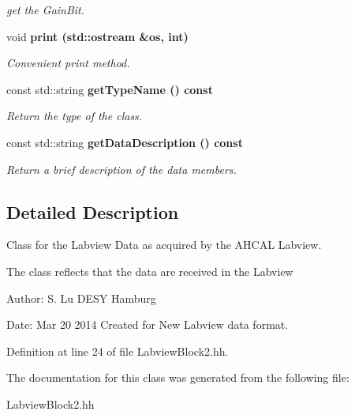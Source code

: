 \begin{CompactItemize}
\begin{CompactList}\small\item\em get the Gain\-Bit. \item\end{CompactList}\item 
void \bf{print} (std::ostream \&os, int)\label{classCALICE_1_1LabviewBlock2_6798a2e15897864857ee0af2d3028bc1}

\begin{CompactList}\small\item\em Convenient print method. \item\end{CompactList}\item 
const std::string \bf{get\-Type\-Name} () const \label{classCALICE_1_1LabviewBlock2_4d821c9d5842cbff0af2e0305be868c8}

\begin{CompactList}\small\item\em Return the type of the class. \item\end{CompactList}\item 
const std::string \bf{get\-Data\-Description} () const \label{classCALICE_1_1LabviewBlock2_62f57877859eafb378c5c87513035317}

\begin{CompactList}\small\item\em Return a brief description of the data members. \item\end{CompactList}\end{CompactItemize}


\subsection{Detailed Description}
Class for the Labview Data as acquired by the AHCAL Labview. 

The class reflects that the data are received in the Labview \begin{Desc}
\item[Author:]S. Lu DESY Hamburg \end{Desc}
\begin{Desc}
\item[Date:]Mar 20 2014 Created for New Labview data format. \end{Desc}




Definition at line 24 of file Labview\-Block2.hh.

The documentation for this class was generated from the following file:\begin{CompactItemize}
\item 
Labview\-Block2.hh\end{CompactItemize}
